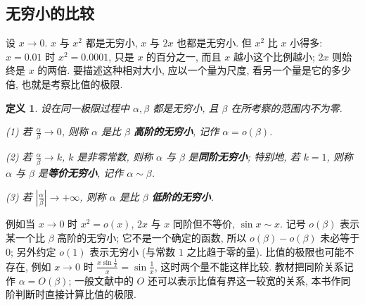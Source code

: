 \documentclass[UTF8,openany]{ctexbook}
\theoremstyle{chinesetextbook}
\newtheorem{definition}{定义}[section]
\begin{document}
\subsection{无穷小的比较}
设 $x\to0$. $x$ 与 $x^2$ 都是无穷小, $x$ 与 $2x$ 也都是无穷小. 但 $x^2$ 比 $x$ 小得多: $x=0.01$ 时 $x^2=0.0001$, 只是 $x$ 的百分之一, 而且 $x$ 越小这个比例越小; $2x$ 则始终是 $x$ 的两倍. 要描述这种相对大小, 应以一个量为尺度, 看另一个量是它的多少倍, 也就是考察比值的极限.
\begin{definition}
设在同一极限过程中 $\alpha,\beta$ 都是无穷小, 且 $\beta$ 在所考察的范围内不为零.

\textup{(1)} 若 $\displaystyle\frac\alpha\beta\to0$, 则称 $\alpha$ 是比 $\beta$ \textbf{高阶的无穷小}, 记作 $\alpha=o(\beta)$.

\textup{(2)} 若 $\displaystyle\frac\alpha\beta\to k$, $k$ 是非零常数, 则称 $\alpha$ 与 $\beta$ 是\textbf{同阶无穷小}; 特别地, 若 $k=1$, 则称 $\alpha$ 与 $\beta$ 是\textbf{等价无穷小}, 记作 $\alpha\sim\beta$.

\textup{(3)} 若 $\displaystyle\left|\frac\alpha\beta\right|\to+\infty$, 则称 $\alpha$ 是比 $\beta$ \textbf{低阶的无穷小}.
\end{definition}
例如当 $x\to0$ 时 $x^2=o(x)$, $2x$ 与 $x$ 同阶但不等价, $\sin x\sim x$. 记号 $o(\beta)$ 表示某一个比 $\beta$ 高阶的无穷小; 它不是一个确定的函数, 所以 $o(\beta)-o(\beta)$ 未必等于 $0$; 另外约定 $o(1)$ 表示无穷小 (与常数 $1$ 之比趋于零的量). 比值的极限也可能不存在, 例如 $x\to0$ 时 $\displaystyle\frac{x\sin\frac1x}x=\sin\frac1x$, 这时两个量不能这样比较. 教材把同阶关系记作 $\alpha=O(\beta)$; 一般文献中的 $O$ 还可以表示比值有界这一较宽的关系, 本书作同阶判断时直接计算比值的极限.
\end{document}
